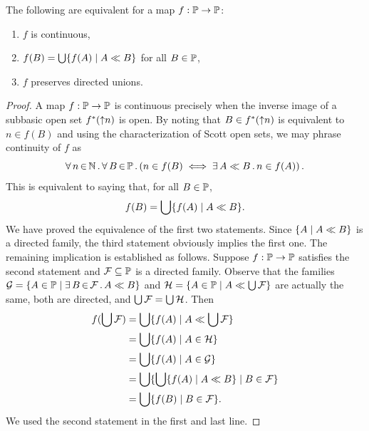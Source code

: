 \begin{proposition}
  The following are equivalent for a map $f : \mathbb{P} \to \mathbb{P}$:
  \begin{enumerate}
  \item $f$ is continuous,
  \item $f(B) = \bigcup\nolimits \{f(A) \mid A \ll B\}$ for all $B \in \mathbb{P}$,
  \item $f$ preserves directed unions.
  \end{enumerate}
\end{proposition}

\begin{proof}
  A map $f : \mathbb{P} \to \mathbb{P}$ is continuous precisely when the
  inverse image of a subbasic open set $f^{*}({\uparrow}n)$ is open.
  By noting that $B \in f^{*}({\uparrow}n)$ is equivalent to $n \in
  f(B)$ and using the characterization of Scott open sets, we may
  phrase continuity of $f$ as
  \begin{equation*}
    \forall\, n \,{\in}\, \mathbb{N}\,.\,
      \forall\, B \,{\in}\, \mathbb{P}\,.\left(
        n \in f(B) \iff \exists\, A \ll B\,.\,n \in f(A)
      \right)
   .
  \end{equation*}
  This is equivalent to saying that, for all $B \in \mathbb{P}$,
  \begin{equation*}
    f(B) = \bigcup\nolimits \{f(A) \mid A \ll B\}.
  \end{equation*}
  We have proved the equivalence of the first two statements. Since
  $\{A \mid A \ll B\}$ is a directed family, the third statement
  obviously implies the first one. The remaining implication is
  established as follows. Suppose $f : \mathbb{P} \to \mathbb{P}$ satisfies
  the second statement and $\mathcal{F} \subseteq \mathbb{P}$ is a
  directed family. Observe that the families $\mathcal{G} = \{A \in
    \mathbb{P} \mid \exists\, B \,{\in}\, \mathcal{F}\,.\,A \ll B\}$ and $\mathcal{H}
  = \{A \in \mathbb{P} \mid A \ll \bigcup\nolimits \mathcal{F}\}$ are
  actually the same, both are directed, and $\bigcup\nolimits \mathcal{F} =
  \bigcup\nolimits \mathcal{H}$. Then
  \begin{align*}
    f (\bigcup\nolimits \mathcal{F}) &=
    \bigcup\nolimits \{f(A) \mid A \ll \bigcup\nolimits \mathcal{F}\} \\
    &= \bigcup\nolimits \{f(A) \mid A \in \mathcal{H}\} \\
    &= \bigcup\nolimits \{f(A) \mid A \in \mathcal{G}\} \\
    &= \bigcup\nolimits \{\bigcup\nolimits \{f(A) \mid A \ll B\} \mid B \in \mathcal{F}\} \\
    &= \bigcup\nolimits \{f(B) \mid B \in \mathcal{F}\}.
  \end{align*}
  We used the second statement in the first and last line.
\end{proof}

